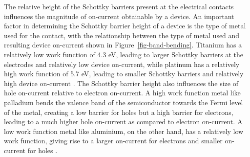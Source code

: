 \documentclass[
  a4paper,
]{scrbook}
\begin{document}
The relative height of the Schottky barriers present at the electrical
contacts influences the magnitude of on-current obtainable by a device.
An important factor in determining the Schottky barrier height of a
device is the type of metal used for the contact, with the relationship
between the type of metal used and resulting device on-current shown in
Figure~\ref{fig-band-bending}. Titanium has a relatively low work
function of 4.3 eV, leading to larger Schottky barriers at the
electrodes and relatively low device on-current, while platinum has a
relatively high work function of 5.7 eV, leading to smaller Schottky
barriers and relatively high device on-current \autocite{Bargaoui2018}.
The Schottky barrier height also influences the size of hole on-current
relative to electron on-current. A high work function metal like
palladium bends the valence band of the semiconductor towards the Fermi
level of the metal, creating a low barrier for holes but a high barrier
for electrons, leading to a much higher hole on-current as compared to
electron on-current. A low work function metal like aluminium, on the
other hand, has a relatively low work function, giving rise to a larger
on-current for electrons and smaller on-current for holes
\autocite{Chen2005,Avouris2007,Bargaoui2018}.
\end{document}
